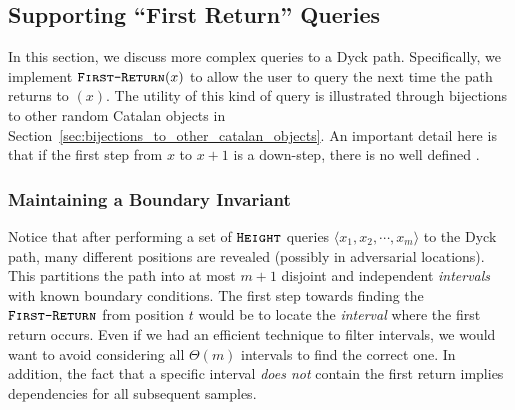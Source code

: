 \subsection{Supporting ``First Return'' Queries}%
\label{sec:supporting_first_return_queries}
In this section, we discuss more complex queries to a Dyck path.
Specifically, we implement $\texttt{\textsc{First-Return}}(x)$ to allow the user to query the next time the path returns to $(x)$.
The utility of this kind of query is illustrated through bijections to other random Catalan objects
in Section~\ref{sec:bijections_to_other_catalan_objects}.
An important detail here is that if the first step from $x$ to $x+1$ is a down-step, there is no well defined .




\subsubsection{Maintaining a Boundary Invariant}
\label{sec:maintaining_a_boundary_invariant}
Notice that after performing a set of $\texttt{\textsc{Height}}$ queries $\langle x_1, x_2,\cdots, x_m \rangle$ to the Dyck path,
many different positions are revealed (possibly in adversarial locations).
This partitions the path into at most $m+1$ disjoint and independent \emph{intervals} with known boundary conditions.
The first step towards finding the $\texttt{\textsc{First-Return}}$ from position $t$ would be to locate the \emph{interval} where the first return occurs.
Even if we had an efficient technique to filter intervals, we would want to avoid considering all $\Theta(m)$ intervals to find the correct one.
In addition, the fact that a specific interval \emph{does not} contain the first return implies dependencies for all subsequent samples.

